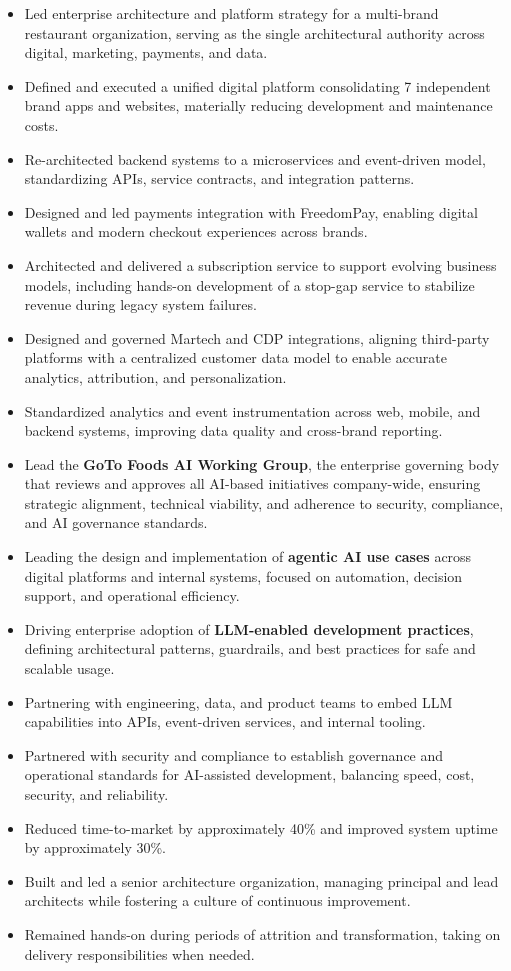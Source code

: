 \documentclass[11pt]{article}
\begin{document}
\begin{itemize}
  \item Led enterprise architecture and platform strategy for a multi-brand restaurant organization, serving as the single architectural authority across digital, marketing, payments, and data.
  \item Defined and executed a unified digital platform consolidating 7 independent brand apps and websites, materially reducing development and maintenance costs.
  \item Re-architected backend systems to a microservices and event-driven model, standardizing APIs, service contracts, and integration patterns.
  \item Designed and led payments integration with FreedomPay, enabling digital wallets and modern checkout experiences across brands.
  \item Architected and delivered a subscription service to support evolving business models, including hands-on development of a stop-gap service to stabilize revenue during legacy system failures.
  \item Designed and governed Martech and CDP integrations, aligning third-party platforms with a centralized customer data model to enable accurate analytics, attribution, and personalization.
  \item Standardized analytics and event instrumentation across web, mobile, and backend systems, improving data quality and cross-brand reporting.
  \item Lead the \textbf{GoTo Foods AI Working Group}, the enterprise governing body that reviews and approves all AI-based initiatives company-wide, ensuring strategic alignment, technical viability, and adherence to security, compliance, and AI governance standards.
  \item Leading the design and implementation of \textbf{agentic AI use cases} across digital platforms and internal systems, focused on automation, decision support, and operational efficiency.
  \item Driving enterprise adoption of \textbf{LLM-enabled development practices}, defining architectural patterns, guardrails, and best practices for safe and scalable usage.
  \item Partnering with engineering, data, and product teams to embed LLM capabilities into APIs, event-driven services, and internal tooling.
  \item Partnered with security and compliance to establish governance and operational standards for AI-assisted development, balancing speed, cost, security, and reliability.

  \item Reduced time-to-market by approximately 40\% and improved system uptime by approximately 30\%.
  \item Built and led a senior architecture organization, managing principal and lead architects while fostering a culture of continuous improvement.
  \item Remained hands-on during periods of attrition and transformation, taking on delivery responsibilities when needed.
\end{itemize}
\end{document}
